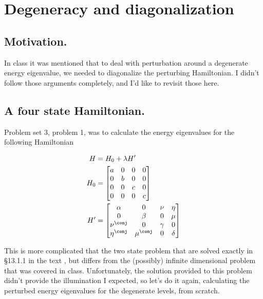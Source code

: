 
%

\usepackage{easybmat}

\chapter{Degeneracy and diagonalization}
\label{chap:pertubationDegeneracy}
{}
\date{Nov 7, 2011}

\beginArtWithToc

\section{Motivation.}

In class it was mentioned that to deal with perturbation around a degenerate energy eigenvalue, we needed to diagonalize the perturbing Hamiltonian.  I didn't follow those arguments completely, and I'd like to revisit those here.

\section{A four state Hamiltonian.}

Problem set 3, problem 1, was to calculate the energy eigenvalues for the following Hamiltonian

\begin{align}\label{eqn:pertubationDegeneracy:10}
H &= H_0 + \lambda H' \\
H_0 &=
\begin{bmatrix}
a & 0 & 0 & 0 \\
0 & b & 0 & 0 \\
0 & 0 & c & 0 \\
0 & 0 & 0 & c 
\end{bmatrix} \\
H' &=
\begin{bmatrix}
\alpha 		& 0 		& \nu 		& \eta \\
0 		& \beta 	& 0 		& \mu \\
\nu^\conj 	& 0 		& \gamma 	& 0 \\
\eta^\conj 	& \mu^\conj 	& 0 		& \delta
\end{bmatrix}
\end{align}

This is more complicated that the two state problem that are solved exactly in \S 13.1.1 in the text \cite{desai2009quantum}, but differs from the (possibly) infinite dimensional problem that was covered in class.  Unfortunately, the solution provided to this problem didn't provide the illumination I expected, so let's do it again, calculating the perturbed energy eigenvalues for the degenerate levels, from scratch.

